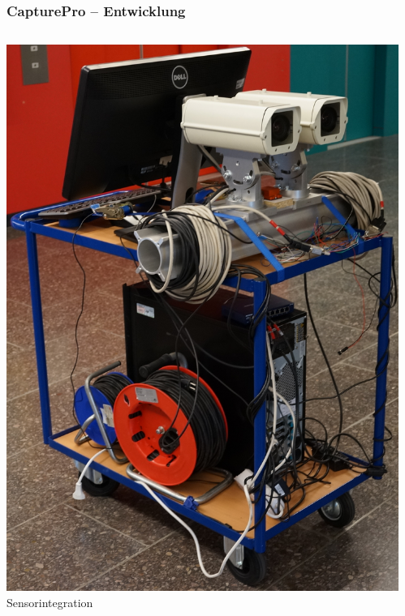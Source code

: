 \documentclass[aspectratio=169]{beamer}
\begin{document}
\begin{frame}
\frametitle{CapturePro -- Entwicklung}
  \begin{columns}[onlytextwidth]
    \begin{column}{0.33\textwidth}
      \includegraphics[height=0.7\textheight]{./Abbildungen/cappro_1.JPG}
      \\
      Sensorintegration
    \end{column}
    \begin{column}{0.33\textwidth}

\end{column}
\end{columns}
\end{frame}
\end{document}
